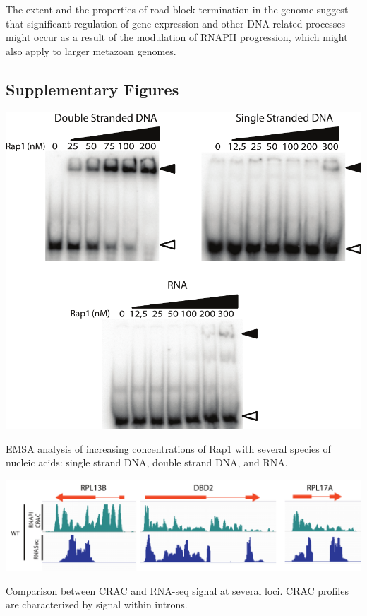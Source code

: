 The extent and the properties of road-block termination in the \cer{} genome suggest that significant regulation of gene expression and other DNA-related processes might occur as a result of the modulation of RNAPII progression, which might also apply to larger metazoan genomes. 

\clearpage

\subsection{Supplementary Figures}




\begin{suppfigure}[h!]

\centering
\includegraphics[width=\textwidth]{figures/results/rap/S2.pdf}
\caption[Rap1 affinity for single and double stranded DNA and RNA]{EMSA analysis of increasing concentrations of Rap1 with several species of nucleic acids: single strand DNA, double strand DNA, and RNA.}
\label{fig:S2}

\end{suppfigure}



\begin{suppfigure}[h!]

\centering
\includegraphics[width=\textwidth]{figures/results/rap/S3.pdf}
\caption[comparison between CRAC and RNA-seq signal]{Comparison between CRAC and RNA-seq signal at several loci. CRAC profiles are characterized by signal within introns.}
\label{fig:S3}

\end{suppfigure}




